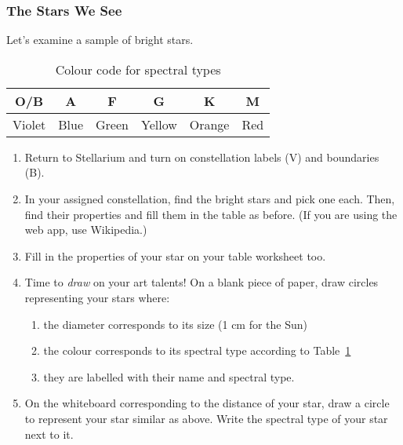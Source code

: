 \documentclass[main.tex]{subfiles}
\begin{document}
\subsubsection{The Stars We See}
Let's examine a sample of bright stars.

\begin{table}[htbp]
\caption{Colour code for spectral types}
\begin{center}
\begin{tabular}{|c|c|c|c|c|c|}\hline
O/B & A & F & G & K & M \\\hline
Violet & Blue & Green & Yellow & Orange & Red \\\hline
\end{tabular}
\end{center}
\label{tab:col}
\end{table}

\begin{enumerate}
\item Return to Stellarium and turn on constellation labels (V) and boundaries (B).
\item In your assigned constellation, find the bright stars and pick one each. Then, find their properties and fill them in the table as before. (If you are using the web app, use Wikipedia.)
\item Fill in the properties of your star on your table worksheet too.
\item Time to \emph{draw} on your art talents! On a blank piece of paper, draw circles representing your stars where:
	\begin{enumerate}
	\item the diameter corresponds to its size (1 cm for the Sun)
	\item the colour corresponds to its spectral type according to Table~\ref{tab:col}
	\item they are labelled with their name and spectral type.
	\end{enumerate}
\item On the whiteboard corresponding to the distance of your star, draw a circle to represent your star similar as above. Write the spectral type of your star next to it.
\end{enumerate}
\end{document}
